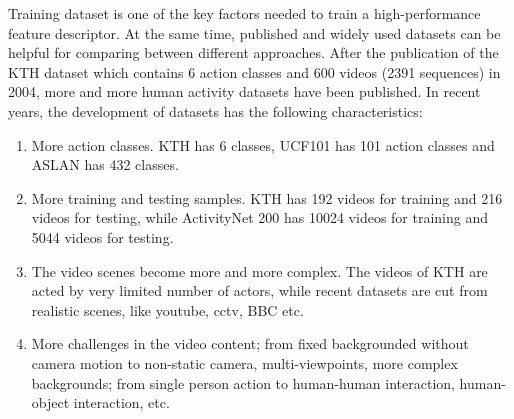 Training dataset is one of the key factors needed to train a high-performance feature descriptor. At the same time, published and widely used datasets can be helpful for comparing between different approaches. After the publication of the KTH \cite{kth} dataset which contains 6 action classes and 600 videos (2391 sequences) in 2004, more and more human activity datasets have been published. In recent years, the development of datasets has the following characteristics:
\begin{enumerate}
	\item More action classes. KTH has 6 classes, UCF101 \cite{ucf101} has 101 action classes and ASLAN \cite{aslan} has 432 classes.
	\item More training and testing samples. KTH has 192 videos for training and 216 videos for testing, while ActivityNet 200 \cite{activitynet200} has 10024 videos for training and 5044 videos for testing.
	\item The video scenes become more and more complex. The videos of KTH are acted by very limited number of actors, while recent datasets are cut from realistic scenes, like youtube, cctv, BBC etc.
	\item More challenges in the video content; from fixed backgrounded without camera motion to  non-static camera, multi-viewpoints, more complex backgrounds; from single person action to  human-human interaction, human-object interaction, etc.    
\end{enumerate}  

